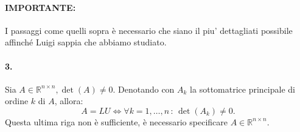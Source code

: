 \paragraph{IMPORTANTE:} I passaggi come quelli sopra è necessario che siano il piu' dettagliati possibile affinché Luigi sappia che abbiamo studiato.

\paragraph{3.} Sia $A\in\mathbb R^{n\times n}, \det(A)\neq 0.$ Denotando con $A_k$ la sottomatrice principale di ordine $k$ di $A$, allora:
\begin{equation*}
    A=LU\iff\forall k=1,\hdots, n\, :\,\det(A_k)\neq 0.
\end{equation*}
Questa ultima riga non è sufficiente, è necessario specificare $A\in\mathbb R^{n\times n}.$

